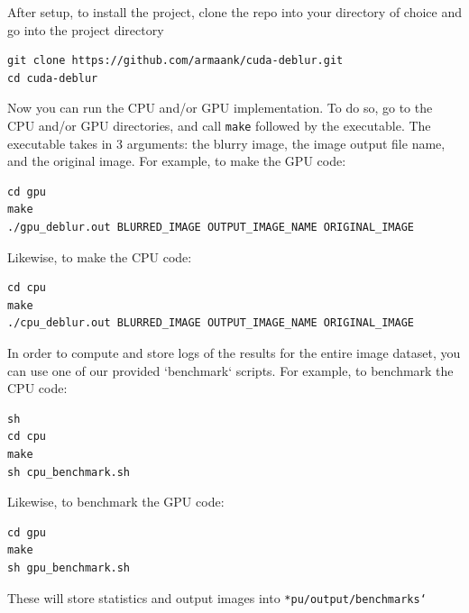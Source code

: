 \documentclass{article}
\begin{document}
After setup, to install the project, clone the repo into your directory of choice and go into the project directory

\begin{verbatim}
git clone https://github.com/armaank/cuda-deblur.git
cd cuda-deblur
\end{verbatim}

Now you can run the CPU and/or GPU implementation. 
To do so, go to the CPU and/or GPU directories, and call \texttt{make} followed by the executable. 
The executable takes in 3 arguments: the blurry image, the image output file name, and the original image. 
For example, to make the GPU code:
\begin{verbatim}
cd gpu
make
./gpu_deblur.out BLURRED_IMAGE OUTPUT_IMAGE_NAME ORIGINAL_IMAGE
\end{verbatim}
Likewise, to make the CPU code:
\begin{verbatim}
cd cpu
make
./cpu_deblur.out BLURRED_IMAGE OUTPUT_IMAGE_NAME ORIGINAL_IMAGE
\end{verbatim}
In order to compute and store logs of the results for the entire image dataset, you can use one of our provided `benchmark` scripts. 
For example, to benchmark the CPU code:
\begin{verbatim}
sh 
cd cpu
make
sh cpu_benchmark.sh
    \end{verbatim}
Likewise, to benchmark the GPU code:
\begin{verbatim}
cd gpu
make
sh gpu_benchmark.sh
\end{verbatim}

These will store statistics and output images into \texttt{*pu/output/benchmarks`}

    

\clearpage
\end{document}
